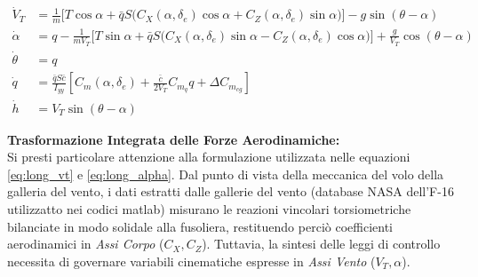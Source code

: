 {\small
	\begin{align}
		\dot{V}_T &= \frac{1}{m} \Big[ T \cos\alpha + \bar{q} S \big(C_X(\alpha, \delta_e) \cos\alpha + C_Z(\alpha, \delta_e) \sin\alpha\big) \Big] - g \sin(\theta - \alpha) \label{eq:long_vt} \\
		\dot{\alpha} &= q - \frac{1}{m V_T} \Big[ T \sin\alpha + \bar{q} S \big(C_X(\alpha, \delta_e) \sin\alpha - C_Z(\alpha, \delta_e) \cos\alpha\big) \Big] + \frac{g}{V_T} \cos(\theta - \alpha) \label{eq:long_alpha} \\
		\dot{\theta} &= q \label{eq:long_theta} \\
		\dot{q} &= \frac{\bar{q} S \bar{c}}{I_{yy}} \left[ C_m(\alpha, \delta_e) + \frac{\bar{c}}{2 V_T} C_{m_q} q + \Delta C_{m_{cg}} \right] \label{eq:long_q} \\
		\dot{h} &= V_T \sin(\theta - \alpha) \label{eq:long_h}
	\end{align}
}

\textbf{Trasformazione Integrata delle Forze Aerodinamiche:}\\
Si presti particolare attenzione alla formulazione utilizzata nelle equazioni \ref{eq:long_vt} e \ref{eq:long_alpha}. Dal punto di vista della meccanica del volo della galleria del vento, i dati estratti dalle gallerie del vento (database NASA dell'F-16 utilizzatto nei codici matlab) misurano le reazioni vincolari torsiometriche bilanciate in modo solidale alla fusoliera, restituendo perciò coefficienti  aerodinamici in \textit{Assi Corpo} ($C_X, C_Z$). Tuttavia, la sintesi delle leggi di controllo necessita di governare variabili cinematiche espresse in \textit{Assi Vento} ($V_T, \alpha$). 

